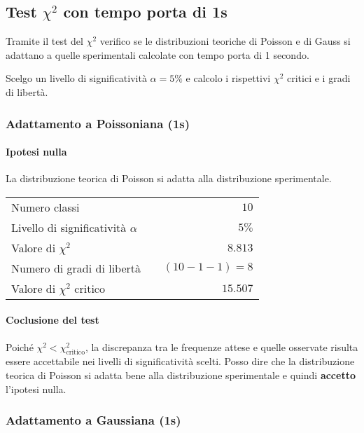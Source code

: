 \documentclass{article}
\begin{document}
\subsection{Test \(\chi^2\) con tempo porta di 1s}
Tramite il test del \(\chi^2\) verifico se le distribuzioni teoriche di Poisson e di Gauss si adattano a quelle sperimentali calcolate con tempo porta di 1 secondo.

Scelgo un livello di significatività $\alpha = 5\%$ e calcolo i rispettivi $\chi^2$ critici e i gradi di libertà.


\subsubsection{Adattamento a Poissoniana (1s)}
\paragraph{Ipotesi nulla} La distribuzione teorica di Poisson si adatta alla distribuzione sperimentale.

\vspace{0.2cm}
\begin{center}
\begin{tabular}{lr}
	Numero classi & $10$ \\
	Livello di significatività $\alpha$		& $ \quad 5\%$  \\
	Valore di $\chi ^2$             	& $\quad 8.813$       \\
	Numero di gradi di libertà      	& $\quad (10-1-1) = 8$         \\   
	Valore di $\chi ^2$ critico     	& $\quad 15.507$
\end{tabular}
\end{center}

\paragraph{Coclusione del test} Poiché $\chi^2 < \chi^2_{\text{critico}}$, la discrepanza tra le frequenze attese e quelle osservate risulta essere accettabile nei livelli di significatività scelti. Posso dire che la distribuzione teorica di Poisson si adatta bene alla distribuzione sperimentale e quindi \textbf{accetto} l'ipotesi nulla.


\subsubsection{Adattamento a Gaussiana (1s)}
\end{document}
